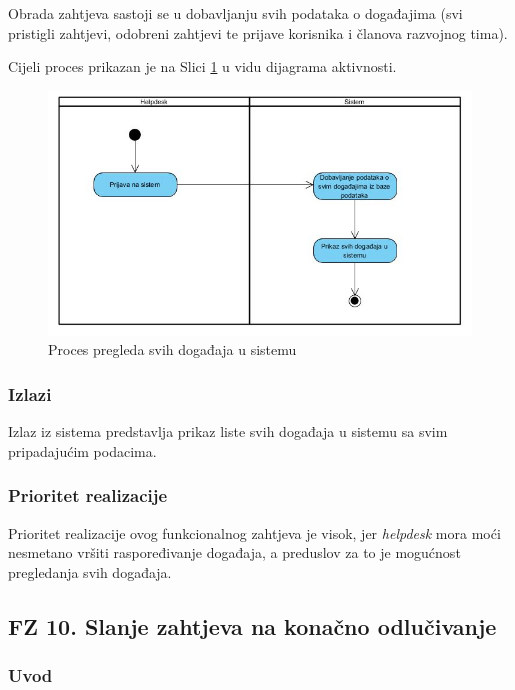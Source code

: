 \documentclass[12pt,a4paper]{article}
\begin{document}
Obrada zahtjeva sastoji se u dobavljanju svih podataka o događajima (svi pristigli zahtjevi, odobreni zahtjevi te prijave korisnika i članova razvojnog tima).

Cijeli proces prikazan je na Slici \ref{act9} u vidu dijagrama aktivnosti.

\begin{figure}[H]
\center
\includegraphics[scale=0.5]{../res/Activity/activity9.JPG}
\caption{Proces pregleda svih događaja u sistemu}
\label{act9}
\end{figure}

\subsubsection{Izlazi}

Izlaz iz sistema predstavlja prikaz liste svih događaja u sistemu sa svim pripadajućim podacima.

\subsubsection{Prioritet realizacije}

Prioritet realizacije ovog funkcionalnog zahtjeva je visok, jer \textit{helpdesk} mora moći nesmetano vršiti raspoređivanje događaja, a preduslov za to je mogućnost pregledanja svih događaja.

\newpage

\subsection{FZ 10. Slanje zahtjeva na konačno odlučivanje}

\subsubsection{Uvod}
\end{document}
